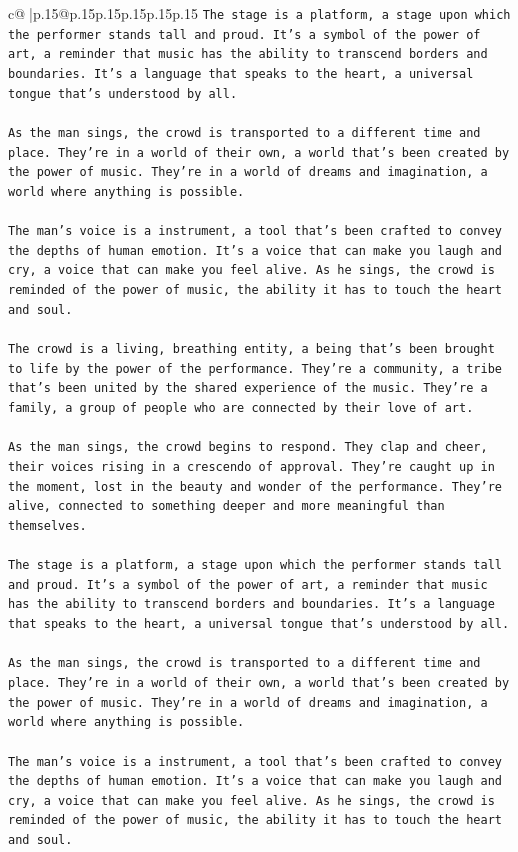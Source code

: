 \documentclass{article}
\begin{document}
{\begin{supertabular}{c@{$\;$}|p{.15\linewidth}@{}p{.15\linewidth}p{.15\linewidth}p{.15\linewidth}p{.15\linewidth}p{.15\linewidth}}
{{{\texttt{The stage is a platform, a stage upon which the performer stands tall and proud. It's a symbol of the power of art, a reminder that music has the ability to transcend borders and boundaries. It's a language that speaks to the heart, a universal tongue that's understood by all.} \\
\\ 
\texttt{As the man sings, the crowd is transported to a different time and place. They're in a world of their own, a world that's been created by the power of music. They're in a world of dreams and imagination, a world where anything is possible.} \\
\\ 
\texttt{The man's voice is a instrument, a tool that's been crafted to convey the depths of human emotion. It's a voice that can make you laugh and cry, a voice that can make you feel alive. As he sings, the crowd is reminded of the power of music, the ability it has to touch the heart and soul.} \\
\\ 
\texttt{The crowd is a living, breathing entity, a being that's been brought to life by the power of the performance. They're a community, a tribe that's been united by the shared experience of the music. They're a family, a group of people who are connected by their love of art.} \\
\\ 
\texttt{As the man sings, the crowd begins to respond. They clap and cheer, their voices rising in a crescendo of approval. They're caught up in the moment, lost in the beauty and wonder of the performance. They're alive, connected to something deeper and more meaningful than themselves.} \\
\\ 
\texttt{The stage is a platform, a stage upon which the performer stands tall and proud. It's a symbol of the power of art, a reminder that music has the ability to transcend borders and boundaries. It's a language that speaks to the heart, a universal tongue that's understood by all.} \\
\\ 
\texttt{As the man sings, the crowd is transported to a different time and place. They're in a world of their own, a world that's been created by the power of music. They're in a world of dreams and imagination, a world where anything is possible.} \\
\\ 
\texttt{The man's voice is a instrument, a tool that's been crafted to convey the depths of human emotion. It's a voice that can make you laugh and cry, a voice that can make you feel alive. As he sings, the crowd is reminded of the power of music, the ability it has to touch the heart and soul.} \\
}}}
\end{supertabular}}
\end{document}
